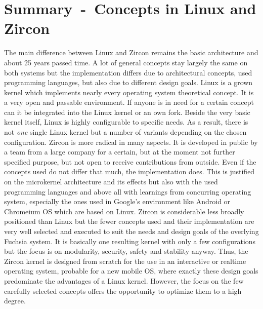 \section{Summary~-~Concepts in Linux and Zircon}
The main difference between Linux and Zircon remains the basic architecture and about 25 years passed time.
A lot of general concepts stay largely the same on both systems but the implementation differs due to architectural concepts, used programming languages, but also due to different design goals.
Linux is a grown kernel which implements nearly every operating system theoretical concept.
It is a very open and passable environment.
If anyone is in need for a certain concept can it be integrated into the Linux kernel or an own fork.
Beside the very basic kernel itself, Linux is highly configurable to specific needs.
As a result, there is not \textit{one} single Linux kernel but a number of variants depending on the chosen configuration.
Zircon is more radical in many aspects.
It is developed in public by a team from a large company for a certain, but at the moment not further specified purpose, but not open to receive contributions from outside.
Even if the concepts used do not differ that much, the implementation does.
This is justified on the microkernel architecture and its effects but also with the used programming languages and above all with learnings from concurring operating system, especially the ones used in Google's environment like Android or Chromeium OS which are based on Linux.
Zircon is considerable less broadly positioned than Linux but the fewer concepts used and their implementation are very well selected and executed to suit the needs and design goals of the overlying Fuchsia system. 
It is basically one resulting kernel with only a few configurations but the focus is on modularity, security, safety and stability anyway\cite{chat-zircon-arch}.
Thus, the Zircon kernel is designed from scratch for the use in an interactive or realtime operating system, probable for a new mobile OS, where exactly these design goals predominate the advantages of a Linux kernel. 
However, the focus on the few carefully selected concepts offers the opportunity to optimize them to a high degree.



